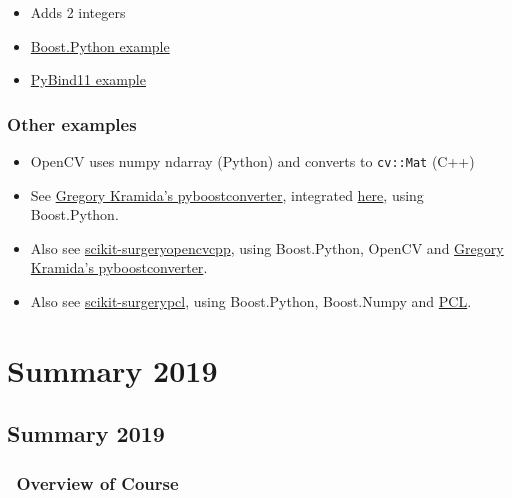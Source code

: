 \begin{itemize}
\itemsep1pt\parskip0pt
\item
  Adds 2 integers
\item
  \href{https://github.com/MattClarkson/CMakeCatchTemplate/blob/master/Code/PythonBoost/mpLibPython.cpp}{Boost.Python
  example}
\item
  \href{https://github.com/MattClarkson/CMakeCatchTemplate/blob/master/Code/PythonPyBind/mpLibPython.cpp}{PyBind11
  example}
\end{itemize}

\subsubsection{Other examples}\label{other-examples}

\begin{itemize}
\itemsep1pt\parskip0pt
\item
  OpenCV uses numpy ndarray (Python) and converts to \texttt{cv::Mat}
  (C++)
\item
  See \href{https://github.com/Algomorph/pyboostcvconverter}{Gregory
  Kramida's pyboostconverter}, integrated
  \href{https://github.com/MattClarkson/CMakeCatchTemplate/blob/master/Code/PythonBoost/mpLibPythonWithOpenCV.cpp\#L34}{here},
  using Boost.Python.
\item
  Also see
  \href{https://github.com/UCL/scikit-surgeryopencvcpp}{scikit-surgeryopencvcpp},
  using Boost.Python, OpenCV and
  \href{https://github.com/Algomorph/pyboostcvconverter}{Gregory
  Kramida's pyboostconverter}.
\item
  Also see
  \href{https://github.com/UCL/scikit-surgerypclcpp}{scikit-surgerypcl},
  using Boost.Python, Boost.Numpy and
  \href{http://pointclouds.org/}{PCL}.
\end{itemize}

\section{Summary 2019}\label{summary-2019}

\subsection{Summary 2019}\label{summary-2019-1}

\subsubsection{~Overview of Course}\label{overview-of-course}

